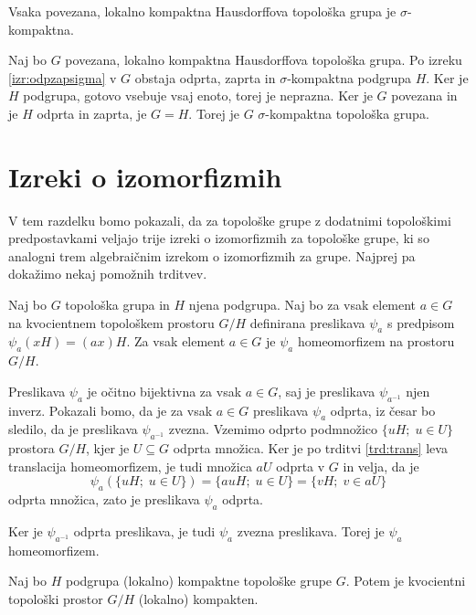 \documentclass[mat1]{fmfdelo}
\begin{document}
\begin{posledica}
	Vsaka povezana, lokalno kompaktna Hausdorffova topološka grupa je $\sigma$-kompaktna.
\end{posledica}

\begin{dokaz}
	Naj bo $G$ povezana, lokalno kompaktna Hausdorffova topološka grupa. Po izreku \ref{izr:odpzapsigma} v $G$ obstaja odprta, zaprta in $\sigma$-kompaktna podgrupa $H$. Ker je $H$ podgrupa, gotovo vsebuje vsaj enoto, torej je neprazna. Ker je $G$ povezana in je $H$ odprta in zaprta, je $G = H$. Torej je $G$ $\sigma$-kompaktna topološka grupa. 
\end{dokaz}

\section{Izreki o izomorfizmih}
V tem razdelku bomo pokazali, da za topološke grupe z dodatnimi topološkimi predpostavkami veljajo trije izreki o izomorfizmih za topološke grupe, ki so analogni trem algebraičnim izrekom o izomorfizmih za grupe. Najprej pa dokažimo nekaj pomožnih trditvev.

\begin{trditev}\label{trd:homogenkvoc}
	Naj bo $G$ topološka grupa in $H$ njena podgrupa. Naj bo za vsak element $a \in G$ na kvocientnem topološkem prostoru $G/H$ definirana preslikava $\psi_a$ s predpisom $\psi_a(xH) = (ax)H$.
	Za vsak element $a \in G$ je $\psi_a$ homeomorfizem na prostoru $G/H$.
\end{trditev}

\begin{dokaz}
Preslikava $\psi_a$ je očitno bijektivna za vsak $a \in G$, saj je preslikava $\psi_{a^{-1}}$ njen inverz. Pokazali bomo, da je za vsak $a \in G$ preslikava $\psi_a$ odprta, iz česar bo sledilo, da je preslikava $\psi_{a^{-1}}$ zvezna.
Vzemimo odprto podmnožico $\lbrace uH ;\; u \in U \rbrace$ prostora $G/H$, kjer je $U \subseteq G$ odprta množica. 
Ker je po trditvi \ref{trd:trans} leva translacija homeomorfizem, je tudi množica $aU$ odprta v $G$ in velja, da je
\[ \psi_a(\lbrace uH ;\; u \in U \rbrace) = \lbrace auH ;\; u \in U \rbrace = \lbrace vH ;\; v \in aU \rbrace \]
odprta množica, zato je preslikava $\psi_a$ odprta.

Ker je $\psi_{a^{-1}}$ odprta preslikava, je tudi $\psi_a$ zvezna preslikava. Torej je $\psi_a$ homeomorfizem.
\end{dokaz}

\begin{trditev}\label{trd:kvockompakt}
	Naj bo $H$ podgrupa (lokalno) kompaktne topološke grupe $G$. Potem je kvocientni topološki prostor $G/H$ (lokalno) kompakten.
\end{trditev}
\end{document}
